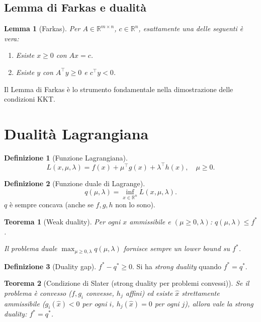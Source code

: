 \documentclass[11pt, a4paper, twoside]{book}
\theoremstyle{definition}
\newtheorem{defn}{Definizione}[chapter]
\theoremstyle{plain}
\newtheorem{thm}{Teorema}[chapter]
\newtheorem{lemma}{Lemma}[chapter]
\theoremstyle{remark}
\newcommand{\R}{\mathbb{R}}
\begin{document}
\subsection{Lemma di Farkas e dualità}

\begin{lemma}[Farkas]
Per $A \in \R^{m \times n}$, $c \in \R^n$, esattamente una delle seguenti è vera:
\begin{enumerate}
  \item Esiste $x \geq 0$ con $Ax = c$.
  \item Esiste $y$ con $A^\top y \geq 0$ e $c^\top y < 0$.
\end{enumerate}
\end{lemma}

Il Lemma di Farkas è lo strumento fondamentale nella dimostrazione delle condizioni KKT.

\section{Dualità Lagrangiana}

\begin{defn}[Funzione Lagrangiana]
\[
  L(x, \mu, \lambda) = f(x) + \mu^\top g(x) + \lambda^\top h(x), \quad \mu \geq 0.
\]
\end{defn}

\begin{defn}[Funzione duale di Lagrange]
\[
  q(\mu, \lambda) = \inf_{x \in \R^n} L(x, \mu, \lambda).
\]
$q$ è sempre concava (anche se $f, g, h$ non lo sono).
\end{defn}

\begin{thm}[Weak duality]
Per ogni $x$ ammissibile e $(\mu \geq 0, \lambda)$: $q(\mu, \lambda) \leq f^*$.

Il \emph{problema duale} $\max_{\mu \geq 0, \lambda} q(\mu, \lambda)$ fornisce sempre un lower bound su $f^*$.
\end{thm}

\begin{defn}[Duality gap]
$f^* - q^* \geq 0$. Si ha \emph{strong duality} quando $f^* = q^*$.
\end{defn}

\begin{thm}[Condizione di Slater (strong duality per problemi convessi)]
Se il problema è convesso ($f, g_i$ convesse, $h_j$ affini) ed esiste $\hat{x}$ strettamente ammissibile ($g_i(\hat{x}) < 0$ per ogni $i$, $h_j(\hat{x}) = 0$ per ogni $j$), allora vale la strong duality: $f^* = q^*$.
\end{thm}
\end{document}
